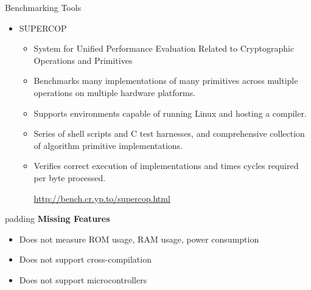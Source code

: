 \documentclass[xcolor=pdftex,dvipsnames,table,final]{beamer}
\begin{document}
\begin{frame}[fragile]{}
\begin{columns}[t, totalwidth=\textwidth]
\begin{column}{.31\linewidth}
      \begin{block}{Benchmarking Tools}
        \begin{itemize}
          \item SUPERCOP
            \begin{itemize}
              \item System for Unified Performance Evaluation Related to Cryptographic Operations and Primitives
              \item Benchmarks many implementations of many primitives across multiple
                  operations on multiple hardware platforms.
              \item Supports environments capable of running Linux and hosting a
                  compiler.
              \item Series of shell scripts and C test harnesses, and comprehensive
                  collection of algorithm primitive implementations.
              \item Verifies correct execution of implementations and times cycles
                  required per byte processed.
              \begin{center}
                  \url{http://bench.cr.yp.to/supercop.html}
              \end{center}
            \end{itemize}
        \end{itemize}
        \begin{center}
        \begin{minipage}[t]{0.9\linewidth}  
        \begin{beamercolorbox}[rounded=true]{padding}
          \textbf{Missing Features}\small
          \begin{itemize}
            \item Does not measure ROM usage, RAM usage, power consumption
            \item Does not support cross-compilation
            \item Does not support microcontrollers
          \end{itemize}
        \end{beamercolorbox}
        \end{minipage}
        \end{center}

\end{block}
\end{column}
\end{columns}
\end{frame}
\end{document}

